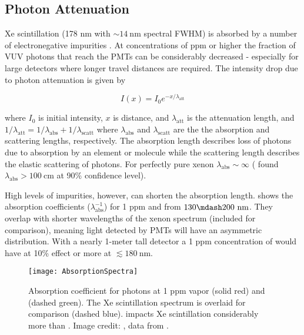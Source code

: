\subsection{Photon Attenuation}
\label{subsec:importance_procedure_effects_photons}
Xe scintillation (178 nm with ${\sim} 14\ \mathrm{nm}$ spectral FWHM) is absorbed by a number of electronegative impurities
.  At concentrations of ppm or higher
the fraction of VUV photons that reach the PMTs can be considerably decreased - especially for large detectors where longer travel
distances are required.  The intensity drop due to photon attenuation is given by

\begin{equation}
I(x) = I_0 e^{-x / \lambda_{\mathrm{att}}}
\end{equation}

\noindent where $I_0$ is initial intensity, $x$ is distance, and $\lambda_{\mathrm{att}}$ is the attenuation length, and
$1 / \lambda_{\mathrm{att}} = 1 / \lambda_{\mathrm{abs}} + 1 / \lambda_{\mathrm{scatt}}$ where $\lambda_{\mathrm{abs}}$ and
$\lambda_{\mathrm{scatt}}$ are the the absorption and scattering lengths, respectively.  The absorption length describes loss of
photons due to absorption by an element or molecule while the scattering length describes the elastic scattering of photons.  For
perfectly pure xenon
$\lambda_{\mathrm{abs}} \sim \infty$ ( found $\lambda_{\mathrm{abs}} > 100\ \mathrm{cm}$ at 90\% confidence
level).

High levels of impurities, however, can shorten the absorption
length.   shows the absorption coefficients
($\lambda_{\mathrm{abs}}^{-1}$) for 1 ppm \htwoo and \otwo from $130 \mdash 200\ \mathrm{nm}$.  They overlap with shorter wavelengths
of the xenon spectrum (included for comparison), meaning light detected by PMTs will have an asymmetric distribution.  With a nearly
1-meter tall detector a 1 ppm concentration of \htwoo would have at 10\% effect or more at $\lesssim 180\ \mathrm{nm}$.

\begin{figure}
\centering
\texttt{[image: AbsorptionSpectra]}
\caption{Absorption coefficient for photons at 1 ppm  vapor (solid red) and  (dashed green).  The Xe scintillation
spectrum is overlaid for comparison (dashed blue).   impacts Xe scintillation considerably
more than .  Image credit: ,  data from .}
\label{fig:importance_procedure_effects_photons_absorption_coefficents}
\end{figure}

